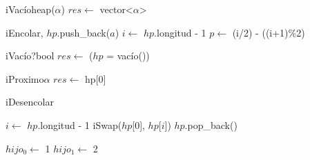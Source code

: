 \begin{Algoritmos}

  \begin{algoritmo}{iVac\'{i}o}{}{heap($\alpha$)}
    $res \gets$ vector<$\alpha$>\;
  \end{algoritmo}

  \begin{algoritmo}{iEncolar}{, }{}
    $hp$.push\_back($a$)\;
     $i \gets$ $hp$.longitud - 1\;
     $p \gets$ (i/2) - ((i+1)\%2)\;
  \end{algoritmo}

  \begin{algoritmo}{iVac\'{i}o?}{}{bool}
    $res \gets$ ($hp$ = vac\'{i}o())\;
  \end{algoritmo}

  \begin{algoritmo}{iProximo}{}{$\alpha$}
    $res \gets$ hp[0]\;
  \end{algoritmo}

  \begin{algoritmo}{iDesencolar}{}{}

     $i \gets$ $hp$.longitud - 1\;
    iSwap($hp$[$0$], $hp$[$i$])\;
    $hp$.pop\_back()\;

     $hijo_{0} \gets$ 1\;
     $hijo_{1} \gets$ 2\;


\end{algoritmo}
\end{Algoritmos}
